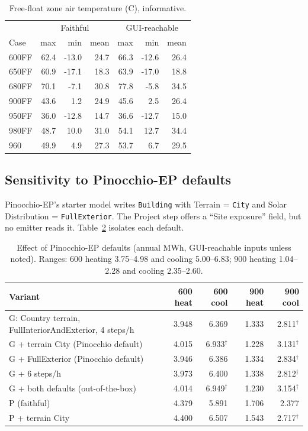 \documentclass[10pt,a4paper]{article}
\newcommand{\code}[1]{\texttt{\small #1}}
\begin{document}
\begin{table}[h]\centering\small
\caption{Free-float zone air temperature (\textdegree C), informative.}\label{tab:ff}
\begin{tabular}{lrrrrrr}\toprule
& \multicolumn{3}{c}{Faithful} & \multicolumn{3}{c}{GUI-reachable}\\
Case & max & min & mean & max & min & mean\\\midrule
600FF & 62.4 & -13.0 & 24.7 & 66.3 & -12.6 & 26.4 \\
650FF & 60.9 & -17.1 & 18.3 & 63.9 & -17.0 & 18.8 \\
680FF & 70.1 & -7.1 & 30.8 & 77.8 & -5.8 & 34.5 \\
900FF & 43.6 & 1.2 & 24.9 & 45.6 & 2.5 & 26.4 \\
950FF & 36.0 & -12.8 & 14.7 & 36.6 & -12.7 & 15.0 \\
980FF & 48.7 & 10.0 & 31.0 & 54.1 & 12.7 & 34.4 \\
960 & 49.9 & 4.9 & 27.3 & 53.7 & 6.7 & 29.5 \\
\bottomrule\end{tabular}
\end{table}

\subsection{Sensitivity to Pinocchio-EP defaults}
Pinocchio-EP's starter model writes \code{Building} with Terrain = \code{City} and Solar Distribution =
\code{FullExterior}. The Project step offers a ``Site exposure'' field, but no emitter reads it. Table~\ref{tab:sens}
isolates each default.

\begin{table}[h]\centering\small
\caption{Effect of Pinocchio-EP defaults (annual MWh, GUI-reachable inputs unless noted). Ranges: 600 heating
3.75--4.98 and cooling 5.00--6.83; 900 heating 1.04--2.28 and cooling 2.35--2.60.}\label{tab:sens}
\begin{tabular}{lrrrr}\toprule
Variant & 600 heat & 600 cool & 900 heat & 900 cool\\\midrule
G: Country terrain, FullInteriorAndExterior, 4 steps/h & 3.948 & 6.369 & 1.333 & 2.811$^{\dagger}$\\
G + terrain City (Pinocchio default) & 4.015 & 6.933$^{\dagger}$ & 1.228 & 3.131$^{\dagger}$\\
G + FullExterior (Pinocchio default) & 3.946 & 6.386 & 1.334 & 2.834$^{\dagger}$\\
G + 6 steps/h & 3.973 & 6.400 & 1.338 & 2.812$^{\dagger}$\\
G + both defaults (out-of-the-box) & 4.014 & 6.949$^{\dagger}$ & 1.230 & 3.154$^{\dagger}$\\
P (faithful) & 4.379 & 5.891 & 1.706 & 2.377\\
P + terrain City & 4.400 & 6.507 & 1.543 & 2.717$^{\dagger}$\\\bottomrule
\end{tabular}
\end{table}
\end{document}

